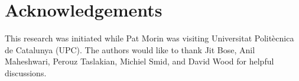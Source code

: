 \documentclass[lotsofwhite]{patmorin}
\begin{document}
\section*{Acknowledgements}

This research was initiated while Pat Morin was visiting Universitat
Polit\`ecnica de Catalunya (UPC). 
The authors would like to thank Jit Bose, Anil Maheshwari, Perouz
Taslakian, Michiel Smid, and David Wood for helpful discussions.



\end{document}
